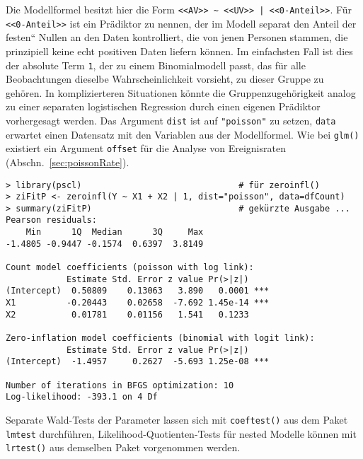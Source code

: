 Die Modellformel besitzt hier die Form \lstinline!<<AV>> ~ <<UV>> | <<0-Anteil>>!. Für \lstinline!<<0-Anteil>>! ist ein Prädiktor zu nennen, der im Modell separat den Anteil der {\quotedblbase}festen{\textquotedblleft} Nullen an den Daten kontrolliert, die von jenen Personen stammen, die prinzipiell keine echt positiven Daten liefern können. Im einfachsten Fall ist dies der absolute Term \lstinline!1!, der zu einem Binomialmodell passt, das für alle Beobachtungen dieselbe Wahrscheinlichkeit vorsieht, zu dieser Gruppe zu gehören. In komplizierteren Situationen könnte die Gruppenzugehörigkeit analog zu einer separaten logistischen Regression durch einen eigenen Prädiktor vorhergesagt werden. Das Argument \lstinline!dist! ist auf \lstinline!"poisson"! zu setzen, \lstinline!data! erwartet einen Datensatz mit den Variablen aus der Modellformel. Wie bei \lstinline!glm()! existiert ein Argument \lstinline!offset! für die Analyse von Ereignisraten (Abschn.\ \ref{sec:poissonRate}).
\begin{lstlisting}
> library(pscl)                               # für zeroinfl()
> ziFitP <- zeroinfl(Y ~ X1 + X2 | 1, dist="poisson", data=dfCount)
> summary(ziFitP)                             # gekürzte Ausgabe ...
Pearson residuals:
    Min      1Q  Median      3Q     Max
-1.4805 -0.9447 -0.1574  0.6397  3.8149

Count model coefficients (poisson with log link):
            Estimate Std. Error z value Pr(>|z|)
(Intercept)  0.50809    0.13063   3.890   0.0001 ***
X1          -0.20443    0.02658  -7.692 1.45e-14 ***
X2           0.01781    0.01156   1.541   0.1233

Zero-inflation model coefficients (binomial with logit link):
            Estimate Std. Error z value Pr(>|z|)
(Intercept)  -1.4957     0.2627  -5.693 1.25e-08 ***

Number of iterations in BFGS optimization: 10
Log-likelihood: -393.1 on 4 Df
\end{lstlisting}

Separate Wald-Tests der Parameter lassen sich mit \lstinline!coeftest()! aus dem Paket \lstinline!lmtest! durchführen, Likelihood-Quotienten-Tests für nested Modelle können mit \lstinline!lrtest()! aus demselben Paket vorgenommen werden.


